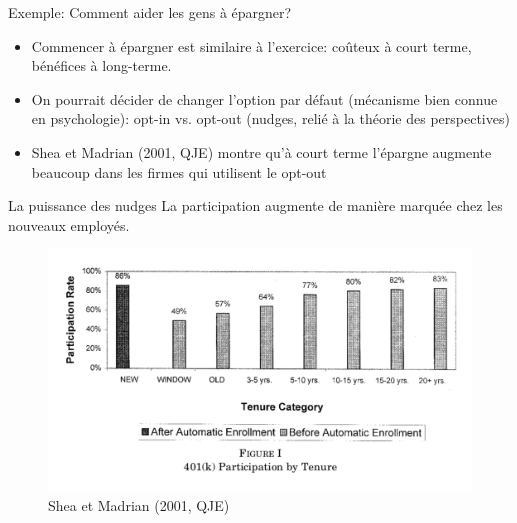 \documentclass[handout]{beamer}
\begin{document}
\begin{frame}{Exemple: Comment aider les gens à épargner?}

\begin{itemize}
\item Commencer à épargner est similaire à l'exercice: coûteux à court terme, bénéfices à long-terme.
\item On pourrait décider de changer l'option par défaut (mécanisme bien connue en psychologie): opt-in vs. opt-out (nudges, relié à la théorie des perspectives)
\item Shea et Madrian (2001, QJE) montre qu'à court terme l'épargne augmente beaucoup dans les firmes qui utilisent le opt-out
\end{itemize}

\end{frame}

\begin{frame}{La puissance des nudges}
La participation augmente de manière marquée chez les nouveaux employés.
	\begin{figure}
		\includegraphics[scale=0.45]{shea.png}
		\caption{Shea et Madrian (2001, QJE)}
	\end{figure}
\end{frame}
\end{document}
